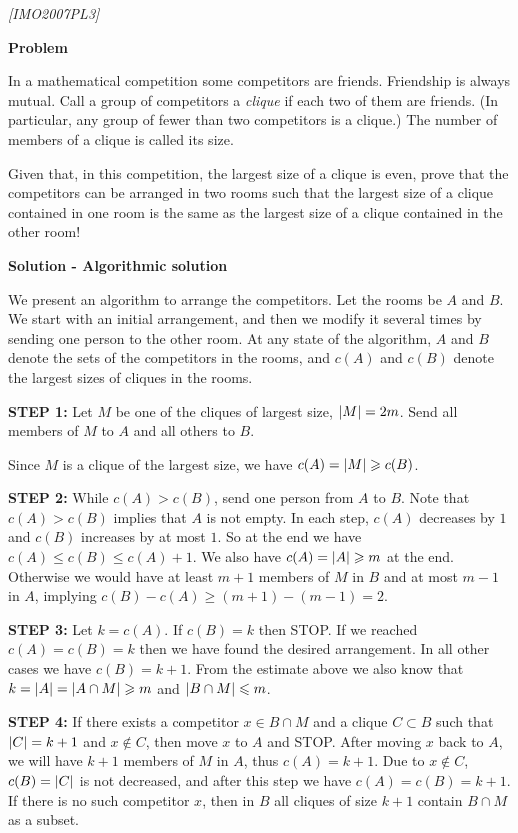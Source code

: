 %
\filbreak
\begin{problem}
\textit{[IMO2007PL3]}

\textbf{Problem}

In a mathematical competition some competitors are friends. Friendship is always mutual. Call a group of competitors a \textit{clique} if each two of them are friends. (In particular, any group of fewer than two competitors is a clique.) The number of members of a clique is called its size. 

Given that, in this competition, the largest size of a clique is even, prove that the competitors can be arranged in two rooms such that the largest size of a clique contained in one room is the same as the largest size of a clique contained in the other room!

\textbf{Solution - Algorithmic solution}

We present an algorithm to arrange the competitors. Let the rooms be $A$ and $B$. We start with an
initial arrangement, and then we modify it several times by sending one person to the other room. At
any state of the algorithm, $A$ and $B$ denote the sets of the competitors in the rooms, and $c(A)$ and
$c(B)$ denote the largest sizes of cliques in the rooms.

\textbf{STEP 1:} Let $M$ be one of the cliques of largest size, $\lvert M\rvert = 2m$. Send all members of $M$ to $A$ and all
others to $B$.  

Since $M$ is a clique of the largest size, we have $c(A) = \lvert M\rvert \geqslant  c(B)$.

\textbf{STEP 2:} While $c(A) > c(B)$, send one person from $A$ to $B$.
Note that $c(A) > c(B)$ implies that $A$ is not empty. In each step, $c(A)$ decreases by $1$ and $c(B)$
increases by at most $1$. So at the end we have $c(A) \leq c(B) \leq c(A) + 1$.
We also have $c(A) = \lvert A\rvert\geqslant m$ at the end. Otherwise we would have at least $m + 1$ members of $M$ in
$B$ and at most $m − 1$ in $A$, implying $c(B) − c(A) \geq (m + 1) − (m − 1) = 2$.


\textbf{STEP 3:}  Let $k = c(A)$. If $c(B) = k$ then STOP.
If we reached $c(A) = c(B) = k$ then we have found the desired arrangement. In all other cases we have
$c(B) = k + 1$. From the estimate above we also know that $k = \lvert A\rvert = \lvert A \cap  M\rvert \geqslant m$ and $\lvert B \cap M\rvert \leqslant m$.


\textbf{STEP 4:} If there exists a competitor $x \in B \cap M$ and a clique $C \subset B$ such that $\lvert C\rvert = k + 1$ and $x \notin C$,
then move $x$ to $A$ and STOP.
After moving $x$ back to $A$, we will have $k + 1$ members of $M$ in $A$, thus $c(A) = k + 1$. Due to $x \notin C$,
$c(B) = \lvert C\rvert$ is not decreased, and after this step we have $c(A) = c(B) = k + 1$.
If there is no such competitor $x$, then in $B$ all cliques of size $k + 1$ contain $B \cap M$ as a subset.



\end{problem}
